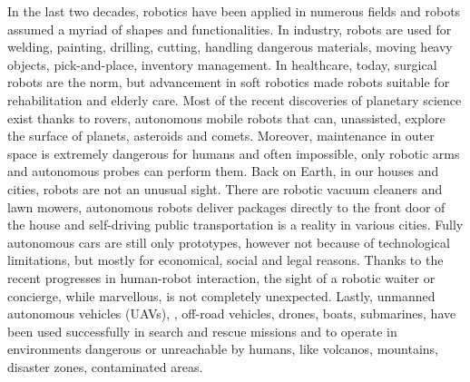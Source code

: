 In the last two decades, robotics have been applied in numerous fields and robots assumed a myriad of shapes and functionalities. In industry, robots are used for welding, painting, drilling, cutting, handling dangerous materials, moving heavy objects, pick-and-place, inventory management. In healthcare, today, surgical robots are the norm, but advancement in soft robotics made robots suitable for rehabilitation and elderly care. Most of the recent discoveries of planetary science exist thanks to rovers, autonomous mobile robots that can, unassisted, explore the surface of planets, asteroids and comets. Moreover, maintenance in outer space is extremely dangerous for humans and often impossible, only robotic arms and autonomous probes can perform them. Back on Earth, in our houses and cities, robots are not an unusual sight. There are robotic vacuum cleaners and lawn mowers,  autonomous robots deliver packages directly to the front door of the house and self-driving public transportation is a reality in various cities. Fully autonomous cars are still only prototypes, however not because of technological limitations, but mostly for economical, social and legal reasons. Thanks to the recent progresses in human-robot interaction, the sight of a robotic waiter or concierge, while marvellous, is not completely unexpected. Lastly, unmanned autonomous vehicles (UAVs), \eg, off-road vehicles, drones, boats, submarines,  have been used successfully in search and rescue missions and to operate in environments dangerous or unreachable by humans, like volcanos, mountains, disaster zones, contaminated areas.

